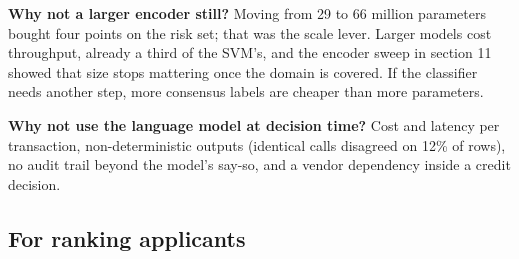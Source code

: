\textbf{Why not a larger encoder still?} Moving from 29 to 66 million parameters bought four points on the risk set; that was the scale lever. Larger models cost throughput, already a third of the SVM's, and the encoder sweep in section 11 showed that size stops mattering once the domain is covered. If the classifier needs another step, more consensus labels are cheaper than more parameters.

\textbf{Why not use the language model at decision time?} Cost and latency per transaction, non-deterministic outputs (identical calls disagreed on 12\% of rows), no audit trail beyond the model's say-so, and a vendor dependency inside a credit decision.

\subsection{For ranking applicants}

